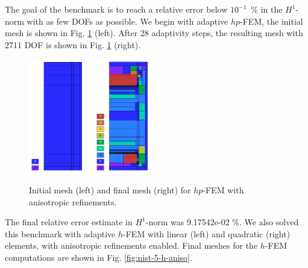 The goal of the benchmark is to reach a relative error below
$10^{-1}$~\% in the $H^1$-norm with as few DOFs as possible.
We begin with adaptive $hp$-FEM,
the initial mesh is shown in Fig. \ref{fig:nist-5-hp-aniso} (left).
After 28 adaptivity steps, the resulting mesh with 2711 DOF is shown
in Fig. \ref{fig:nist-5-hp-aniso} (right).

\begin{figure}[!ht]
\centering
\includegraphics[height=5cm]{nist/nist-5/mesh_hp_aniso_init.png}\ \
\includegraphics[height=5cm]{nist/nist-5/mesh_hp_aniso.png}
\vspace{-2mm}
\caption{Initial mesh (left) and final mesh (right) for $hp$-FEM with anisotropic refinements.}
\label{fig:nist-5-hp-aniso}
\end{figure}

The final relative error estimate in $H^1$-norm was 9.17542e-02 \%.
We also solved this benchmark with adaptive $h$-FEM
with linear (left) and quadratic (right)
elements, with anisotropic refinements enabled.
Final meshes for the $h$-FEM computations are shown
in Fig. \ref{fig:nist-5-h-aniso}.

